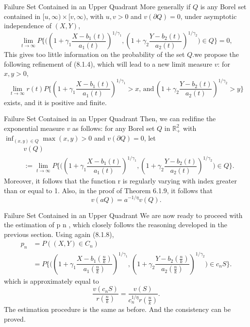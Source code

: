 \documentclass[11pt]{beamer}
\begin{document}
\begin{frame}{Failure Set Contained in an Upper Quadrant}
More generally if $Q$ is any Borel set contained in $[u,\infty)\times [v,\infty)$, with $u,v>0$ and $v(\partial Q)=0$, under asymptotic independence of $(X, Y)$,
\begin{displaymath}
\lim_{t\to \infty} P\{  \big(  (1+\gamma_1 \dfrac{X-b_1(t)}{a_1(t)})^{1/\gamma_1}, (1+\gamma_2 \dfrac{Y-b_2(t)}{a_2(t)})^{1/\gamma_2} \big) \in Q\}=0,
\end{displaymath}
This gives too little information on the probability of the set $Q$.we propose the following refinement of (8.1.4), which will lead to a new limit measure $v$: for $x,y>0$, 
\begin{displaymath}
\lim_{t\to \infty}r(t) P\big \{ (1+\gamma_1 \dfrac{X-b_1(t)}{a_1(t)})^{1/\gamma_1}>x ,\, \text{and}\,    (1+\gamma_2 \dfrac{Y-b_2(t)}{a_2(t)})^{1/\gamma_2}>y   \big  \}
\end{displaymath}
exists, and it is positive and finite.
\end{frame}


\begin{frame}{Failure Set Contained in an Upper Quadrant}
Then, we can redifine the exponential measure $v$ as follows: for any Borel set $Q$ in $\mathbb{R}_{+}^2$ with $\inf_{(x,y)\in Q} \max(x,y)>0$ and $v(\partial Q)=0$, let
\begin{displaymath}
\begin{split}
&v(Q)\\
  &:=\lim_{t\to \infty} P\{  \big(  (1+\gamma_1 \dfrac{X-b_1(t)}{a_1(t)})^{1/\gamma_1}, (1+\gamma_2 \dfrac{Y-b_2(t)}{a_2(t)})^{1/\gamma_2} \big) \in Q\}.
\end{split}
\end{displaymath}
Moreover, it follows that the function r is regularly varying with index greater than
or equal to 1. Also, in the proof of Theorem 6.1.9, it follows that
\begin{displaymath}
v(aQ)=a^{-1/\eta}v(Q).
\end{displaymath}
\end{frame}

\begin{frame}{Failure Set Contained in an Upper Quadrant}
We are now ready to proceed with the estimation of p n , which closely follows the
reasoning developed in the previous section. Using again (8.1.8),
\begin{displaymath}
\begin{split}
p_n&=P((X,Y)\in C_n)\\
 &=P\big \{ \big(    (1+\gamma_1 \dfrac{X-b_1(\frac{n}{k})}{a_1(\frac{n}{k})})^{1/\gamma_1}, (1+\gamma_2 \dfrac{Y-b_2(\frac{n}{k})}{a_2(\frac{n}{k})})^{1/\gamma_2}            \big)\in c_n S\}.
\end{split}
\end{displaymath}
which is approximately equal to
\begin{displaymath}
\dfrac{v(c_nS)}{r(\frac{n}{k})}=\dfrac{v(S)}{c_n^{1/\eta}r(\frac{n}{k})}.
\end{displaymath}
The estimation procedure is the same as before. And the consistency can be proved.
\end{frame}
\end{document}

